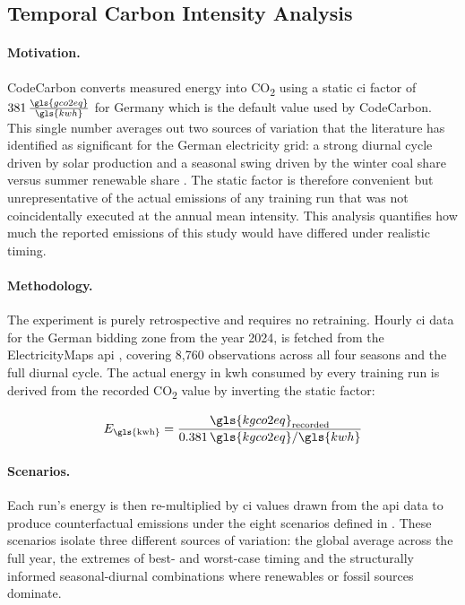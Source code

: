 \subsection{Temporal Carbon Intensity Analysis}
\label{design_carbon_intensity}

\paragraph{Motivation.}
CodeCarbon converts measured energy into CO\textsubscript{2} using a static \gls{ci} factor of $381\,\frac{\gls{gco2eq}}{\gls{kwh}}$ for Germany which is the default value used by CodeCarbon. This single number averages out two sources of variation that the literature has identified as significant for the German electricity grid: a strong diurnal cycle driven by solar production and a seasonal swing driven by the winter coal share versus summer renewable share \cite{dodgeMeasuringCarbonIntensity2022}. The static factor is therefore convenient but unrepresentative of the actual emissions of any training run that was not coincidentally executed at the annual mean intensity. This analysis quantifies how much the reported emissions of this study would have differed under realistic timing.

\paragraph{Methodology.}
The experiment is purely retrospective and requires no retraining. Hourly \gls{ci} data for the German bidding zone from the year 2024, is fetched from the ElectricityMaps \gls{api} \cite{electricityMapsAPI2025}, covering 8{,}760 observations across all four seasons and the full diurnal cycle. The actual energy in \gls{kwh} consumed by every training run is derived from the recorded CO\textsubscript{2} value by inverting the static factor:

\begin{equation}
E_{\text{\gls{kwh}}} = \frac{{\gls{kgco2eq}}_{\text{recorded}}}{0.381 \, \gls{kgco2eq}/\gls{kwh}}
\label{eq:energy_derivation}
\end{equation}

\paragraph{Scenarios.}
Each run's energy is then re-multiplied by \gls{ci} values drawn from the \gls{api} data to produce counterfactual emissions under the eight scenarios defined in . These scenarios isolate three different sources of variation: the global average across the full year, the extremes of best- and worst-case timing and the structurally informed seasonal-diurnal combinations where renewables or fossil sources dominate.

